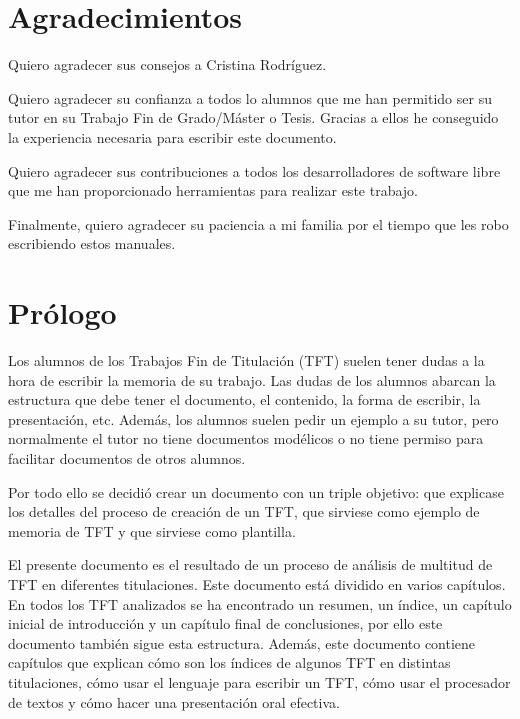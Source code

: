 \documentclass[12pt,spanish,chapterprefix, numbers=noenddot]{book}
\numberwithin{equation}{section}
\numberwithin{figure}{section}
\begin{document}
    \chapter*{Agradecimientos}

    Quiero agradecer sus consejos a Cristina Rodríguez.

    Quiero agradecer su confianza a todos lo alumnos que me han permitido
    ser su tutor en su Trabajo Fin de Grado/Máster o Tesis. Gracias a
    ellos he conseguido la experiencia necesaria para escribir este documento.

    Quiero agradecer sus contribuciones a todos los desarrolladores de
    software libre que me han proporcionado herramientas para realizar
    este trabajo.

    Finalmente, quiero agradecer su paciencia a mi familia por el tiempo
    que les robo escribiendo estos manuales.

    \chapter*{Prólogo}

    Los alumnos de los Trabajos Fin de Titulación (TFT) suelen tener dudas
    a la hora de escribir la memoria de su trabajo. Las dudas de los alumnos
    abarcan la estructura que debe tener el documento, el contenido, la
    forma de escribir, la presentación, etc. Además, los alumnos suelen
    pedir un ejemplo a su tutor, pero normalmente el tutor no tiene documentos
    modélicos o no tiene permiso para facilitar documentos de otros alumnos.

    Por todo ello se decidió crear un documento con un triple objetivo:
    que explicase los detalles del proceso de creación de un TFT, que
    sirviese como ejemplo de memoria de TFT y que sirviese como plantilla.

    El presente documento es el resultado de un proceso de análisis de
    multitud de TFT en diferentes titulaciones. Este documento está dividido
    en varios capítulos. En todos los TFT analizados se ha encontrado
    un resumen, un índice, un capítulo inicial de introducción y un capítulo
    final de conclusiones, por ello este documento también sigue esta
    estructura. Además, este documento contiene capítulos que explican
    cómo son los índices de algunos TFT en distintas titulaciones, cómo
    usar el lenguaje para escribir un TFT, cómo usar el procesador de
    textos y cómo hacer una presentación oral efectiva.
\end{document}
